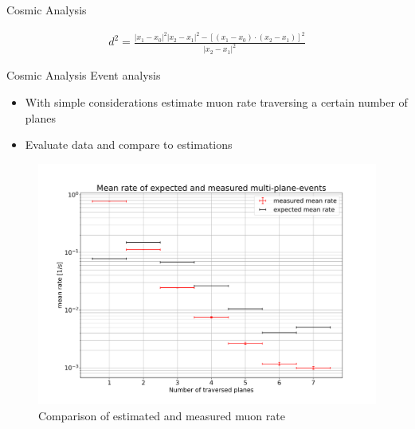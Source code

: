 \documentclass{beamer}
\begin{document}
\begin{frame}[fragile]{Cosmic Analysis}
\begin{minipage}{.4\textwidth}
\begin{figure}[H]
	\end{figure}
    \end{minipage}
    \begin{minipage}{.59\textwidth}
	\footnotesize
	\begin{align*}
	    d^2 = \frac{ \left| x_1-x_0 \right|^2 \left| x_2-x_1 \right|^2
		- \left[ \left( x_1-x_0 \right) \cdot \left( x_2-x_1 \right)
		\right]^2}{\left| x_2-x_1 \right|^2}
	\end{align*}
    \end{minipage}
\end{frame}

\begin{frame}{Cosmic Analysis}
  \LARGE Event analysis \normalsize \\[.1cm]
  \begin{itemize}
    \item With simple considerations estimate muon rate traversing a certain number of planes
    \item Evaluate data and compare to estimations
  \end{itemize}
  \begin{figure}[H]
    \centering
    \includegraphics[width=.8\textwidth]{rate_comparison}
    \caption{Comparison of estimated and measured muon rate}
  \end{figure}
\end{frame}
\end{document}
